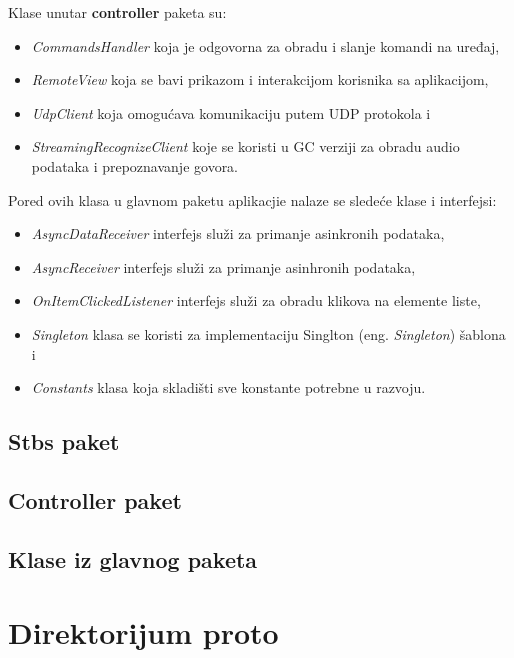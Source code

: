 \documentclass[implementacija.tex]{subfiles}
\begin{document}
Klase unutar \textbf{controller} paketa su:
\begin{itemize}
\item \textit{CommandsHandler} koja je odgovorna za obradu i slanje komandi na uređaj,
\item \textit{RemoteView} koja se bavi prikazom i interakcijom korisnika sa aplikacijom,
\item \textit{UdpClient} koja omogućava komunikaciju putem UDP protokola i
\item \textit{StreamingRecognizeClient} koje se koristi u GC verziji za obradu audio podataka i prepoznavanje govora. 
\end{itemize}


Pored ovih klasa u glavnom paketu aplikacjie nalaze se sledeće klase i interfejsi:
\begin{itemize}
\item \textit{AsyncDataReceiver} interfejs služi za primanje asinkronih podataka,
\item \textit{AsyncReceiver} interfejs služi za primanje asinhronih podataka,
\item \textit{OnItemClickedListener} interfejs služi za obradu klikova na elemente liste,
\item \textit{Singleton} klasa se koristi za implementaciju Singlton (eng. \textit{Singleton}) šablona i
\item \textit{Constants} klasa koja skladišti sve konstante potrebne u razvoju.
\end{itemize}

\subsection{Stbs paket}


\subsection{Controller paket}


\subsection{Klase iz glavnog paketa}

\section{Direktorijum proto}



\end{document}

